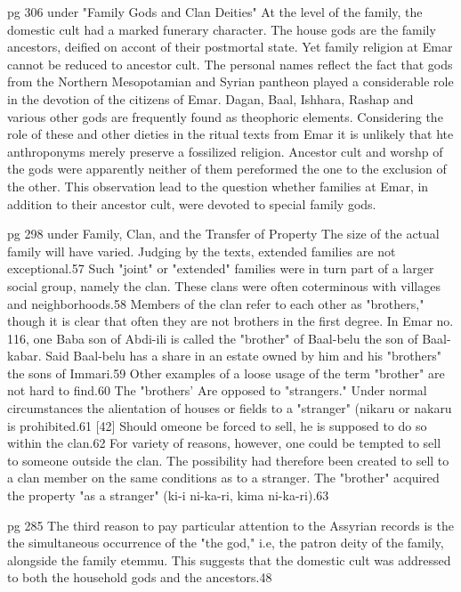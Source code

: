 \documentclass[11pt]{article}
\begin{document}
{pg 306 under "Family Gods and Clan Deities"
At the level of the family, the domestic cult had a marked funerary character. The house gods are the family ancestors, deified on accont of their postmortal state. Yet family religion at Emar cannot be reduced to ancestor cult. The personal names reflect the fact that gods from the Northern Mesopotamian and Syrian pantheon played a considerable role in the devotion of the citizens of Emar. Dagan, Baal, Ishhara, Rashap and various other gods are frequently found as theophoric elements. Considering the role of these and other dieties in the ritual texts from Emar it is unlikely that hte anthroponyms merely preserve a fossilized religion. Ancestor cult and worshp of the gods were apparently neither of them pereformed the one to the exclusion of the other. This observation lead  to the question whether families at Emar, in addition to their ancestor cult, were devoted to special family gods. 

pg 298 under Family, Clan, and the Transfer of Property
The size of the actual family will have varied. Judging by the texts, extended families are not exceptional.57 Such "joint" or "extended" families were in turn part of a larger social group, namely the clan. These clans were often coterminous with villages and neighborhoods.58 Members of the clan refer to each other as "brothers," though it is clear that often they are not brothers in the first degree. In Emar no. 116, one Baba son of Abdi-ili is called the "brother" of Baal-belu the son of Baal-kabar. Said Baal-belu has a share in an estate owned by him and his "brothers" the sons of Immari.59 Other examples of a loose usage of the term "brother" are not hard to find.60 The "brothers' Are opposed to "strangers." Under normal circumstances the alientation of houses or fields to a "stranger" (nikaru or nakaru is prohibited.61 [42] Should omeone be forced to sell, he is supposed to do so within the clan.62 For variety of reasons, however, one could be tempted to sell to someone outside the clan. The possibility had therefore been created to sell to a clan member on the same conditions as to a stranger. The "brother" acquired the property "as a stranger" (ki-i ni-ka-ri, kima ni-ka-ri).63

pg 285 
The third reason to pay particular attention to the Assyrian records is the the simultaneous occurrence of the "the god," i.e, the patron deity of the family, alongside the family etemmu. This suggests that the domestic cult was addressed to both the household gods and the ancestors.48


}
\end{document}

